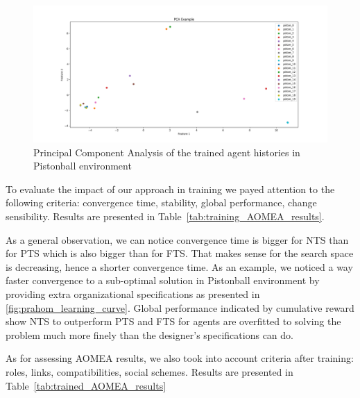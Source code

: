\documentclass[runningheads]{llncs}
\begin{document}
\begin{figure}[h!]
    \centering
    \includegraphics[width=\textwidth]{figures/prahom_pca_analysis.png}
    \caption{Principal Component Analysis of the trained agent histories in Pistonball environment}
    \label{fig:prahom_pca_analysis}
\end{figure}

To evaluate the impact of our approach in training we payed attention to the following criteria: convergence time, stability, global performance, change sensibility. Results are presented in Table~\ref{tab:training_AOMEA_results}.



As a general observation, we can notice convergence time is bigger for NTS than for PTS which is also bigger than for FTS. That makes sense for the search space is decreasing, hence a shorter convergence time. As an example, we noticed a way faster convergence to a sub-optimal solution in Pistonball environment by providing extra organizational specifications as presented in \autoref{fig:prahom_learning_curve}. Global performance indicated by cumulative reward show NTS to outperform PTS and FTS for agents are overfitted to solving the problem much more finely than the designer's specifications can do.

As for assessing AOMEA results, we also took into account criteria after training: roles, links, compatibilities, social schemes. Results are presented in Table~\ref{tab:trained_AOMEA_results}



\end{document}

